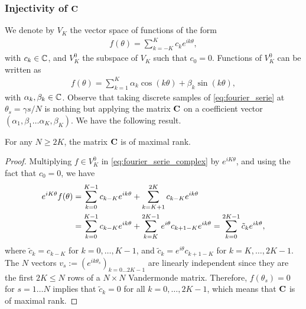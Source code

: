 \subsubsection{Injectivity of $\mathbf{C}$}
\label{sec:injectivity-c}

We denote by $V_K$ the vector space of functions of the form
\begin{align}
  \label{eq:fourier_serie_complex}
  f(\theta)= \sum_{k=-K}^K c_ke^{ik\theta},
\end{align}
with $c_k\in\C$, and $V_K^0$ the subspace of $V_K$ such that
$c_0=0$. Functions of $V^0_K$ can be written as
\begin{align}
  \label{eq:fourier_serie}
  f(\theta)=\sum_{k=1}^K
  \alpha_k\cos(k\theta)+\beta_k\sin(k\theta),
\end{align}
with $\alpha_k, \beta_k\in\C$.
Observe that taking discrete samples of \eqref{eq:fourier_serie}
at $\theta_s=\gamma s/N$ is nothing but applying the matrix $\mathbf{C}$
on a coefficient vector
$(\alpha_1,\beta_1\ldots\alpha_K,\beta_K)$. We have the following
result.
\begin{proposition}
  For any $N\geq 2K$, the matrix $\mathbf{C}$ is of maximal rank.%
\end{proposition}
\begin{proof}
  Multiplying $f\in V_K^0$ in \eqref{eq:fourier_serie_complex} by $e^{i K\theta}$, and using the
  fact that $c_0=0$, we have
  \begin{align}
    \label{eq:e_m_f}
    e^{i K\theta} f(\theta) &= \sum_{k=0}^{K-1} c_{k-K} e^{i k \theta} + \sum_{k=K+1}^{2K} c_{k-K}
    e^{i k \theta} \notag \\
    &=  \sum_{k=0}^{K-1} c_{k-K} e^{i k \theta} + \sum_{k=K}^{2K-1} e^{i\theta}c_{k+1-K} e^{i k
      \theta} = \sum_{k=0}^{2K-1} \tilde c_k e^{i k \theta},
  \end{align}
  where  $\tilde c_k=c_{k-K}$ for $k=0,\ldots, K-1$, and $\tilde c_k = e^{i\theta}
  c_{k+1-K}$ for $k=K, \ldots, 2K-1$. The $N$ vectors $v_s:=(e^{i k\theta_s})_{k=0\ldots 2K-1}$
  are
  linearly independent since they are the first $2K\leq N$ rows of a $N \times N$ Vandermonde
  matrix. Therefore, $f(\theta_s)=0$ for $s=1\ldots N$ implies that $\tilde
c_k=0$ for all $k=0,\ldots, 2K-1$,
 which means that $\mathbf{C}$ is of maximal rank.
\end{proof}


